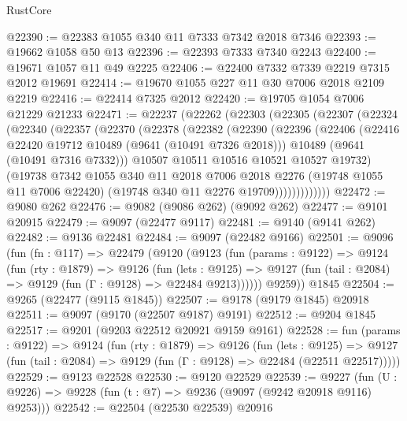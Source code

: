 \begin{lexlean}{RustCore}
\begin{coremodule}
@22390 := @22383 @1055 @340 @11 @7333 @7342 @2018 @7346
@22393 := @19662 @1058 @50 @13
@22396 := @22393 @7333 @7340 @2243
@22400 := @19671 @1057 @11 @49 @2225
@22406 := @22400 @7332 @7339 @2219 @7315 @2012 @19691
@22414 := @19670 @1055 @227 @11 @30 @7006 @2018 @2109 @2219
@22416 := @22414 @7325 @2012
@22420 := @19705 @1054 @7006 @21229 @21233
@22471 := @22237
    (@22262
      (@22303
        (@22305
          (@22307
            (@22324
              (@22340
                (@22357
                  (@22370
                    (@22378
                      (@22382
                        (@22390
                          (@22396
                            (@22406
                              (@22416 @22420 @19712 @10489 (@9641 (@10491 @7326 @2018)))
                              @10489
                              (@9641 (@10491 @7316 @7332)))
                            @10507
                            @10511
                            @10516
                            @10521
                            @10527
                            @19732)
                          (@19738
                            @7342
                            @1055
                            @340
                            @11
                            @2018
                            @7006
                            @2018
                            @2276
                            (@19748 @1055 @11 @7006 @22420)
                            (@19748 @340 @11 @2276 @19709)))))))))))))
@22472 := @9080 @262
@22476 := @9082 (@9086 @262) (@9092 @262)
@22477 := @9101 @20915
@22479 := @9097 (@22477 @9117)
@22481 := @9140 (@9141 @262)
@22482 := @9136 @22481
@22484 := @9097 (@22482 @9166)
@22501 := @9096
    (fun (fn : @117) =>
    @22479
      (@9120
        (@9123
          (fun (params : @9122) =>
          @9124
            (fun (rty : @1879) =>
            @9126
              (fun (lets : @9125) =>
              @9127 (fun (tail : @2084) => @9129 (fun (Γ : @9128) => @22484 @9213))))))
        @9259))
    @1845
@22504 := @9265 (@22477 (@9115 @1845))
@22507 := @9178 (@9179 @1845) @20918
@22511 := @9097 (@9170 (@22507 @9187) @9191)
@22512 := @9204 @1845
@22517 := @9201 (@9203 @22512 @20921 @9159 @9161)
@22528 := fun (params : @9122) =>
  @9124
    (fun (rty : @1879) =>
    @9126
      (fun (lets : @9125) =>
      @9127 (fun (tail : @2084) => @9129 (fun (Γ : @9128) => @22484 (@22511 @22517)))))
@22529 := @9123 @22528
@22530 := @9120 @22529
@22539 := @9227
    (fun (U : @9226) => @9228 (fun (t : @7) => @9236 (@9097 (@9242 @20918 @9116) @9253)))
@22542 := @22504 (@22530 @22539) @20916

\end{coremodule}
\end{lexlean}
